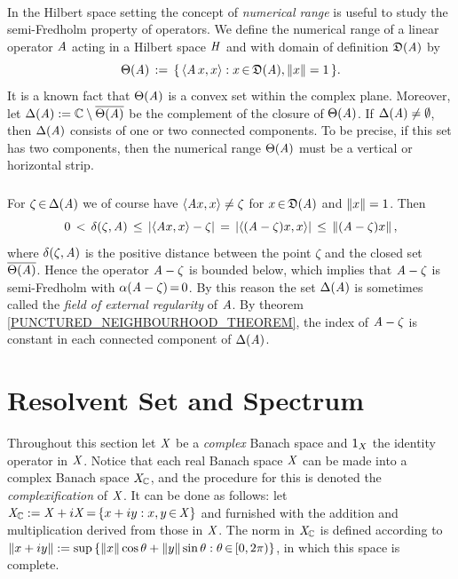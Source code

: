 \documentclass[11pt,twoside]{article}
\begin{document}
\paragraph*{} %
In the Hilbert space setting the concept of \textit{numerical range}
is useful to study the semi-Fredholm property of operators.
We define the {numerical range} of a linear operator $\mathit{A}$ acting
in a Hilbert space $\mathit{H}$ and with domain of definition $\mathfrak{D}(\mathit{A})$ by
\[
\Theta(\mathit{A}) \,:=\,
\{\,\langle \mathit{A} \,x,x \rangle: x {\,\in\,} \mathfrak{D}(\mathit{A}), \left\lVert x \right\rVert=1 \,\}.
\]
It is a known fact that
$\Theta(\mathit{A})$ is a convex set within the complex plane.
Moreover,
let $\Delta(\mathit{A}) := {\mathbb{C}} \setminus \overline{\Theta(\mathit{A})}$
be the complement of the closure of $\Theta(\mathit{A})$.
If $\Delta(\mathit{A}) \neq \emptyset$,
then $\Delta(\mathit{A})$ consists of one or two connected components.
To be precise,
if this set has two components,
then the numerical range $\Theta(\mathit{A})$ must be a vertical or horizontal strip.

\subparagraph*{}
For $\zeta {\,\in\,} \Delta(\mathit{A})$ we of course have $\langle \mathit{A} x,x \rangle \neq \zeta$
for $x {\,\in\,} \mathfrak{D}(\mathit{A})$ and $\left\lVert x \right\rVert=1$.
Then 
\[
0 \, < \, \delta(\zeta,\linA) \, \leq \,
\abs{\scalar{\linA x}{x} - \zeta} \=
\abs{\scalar{(\linA-\zeta)x}{x}} \, \leq \,
\norm{(\linA -\zeta) x},
\]
where $\delta(\zeta,\mathit{A})$ is the positive distance between the point $\zeta$
and the closed set $\overline{\Theta(\mathit{A})}$.
Hence the operator $\mathit{A} -\zeta$ is bounded below,
which implies that $\mathit{A}-\zeta$ is semi-Fredholm with $\alpha(\mathit{A}-\zeta) {\,=\,} 0$.
By this reason the set $\Delta(\mathit{A})$ is sometimes called
the \textit{field of external regularity} of $\mathit{A}$.
By theorem \ref{PUNCTURED_NEIGHBOURHOOD_THEOREM},
the index of $\mathit{A}-\zeta$ is constant
in each connected component of $\Delta(\mathit{A})$.

\section{Resolvent Set and Spectrum}
Throughout this section let $\mathit{X}$ be a \textit{complex} Banach space 
and ${\mathsf{1}}_X$ the identity operator in $\mathit{X}$.
Notice that each real Banach space $\mathit{X}$ can be made
into a complex Banach space $\mathit{X}_{{\mathbb{C}}}$,
and the procedure for this is denoted the \textit{complexification} of $\mathit{X}$.
It can be done as follows:
let $\mathit{X}_{{\mathbb{C}}} := \mathit{X} + i \mathit{X} {\,=\,} \{x+iy: x,y {\,\in\,} \mathit{X}\}$ and furnished
with the addition and multiplication derived from those in $\mathit{X}$.
The norm in $\mathit{X}_{{\mathbb{C}}}$ is defined according to
$\left\lVert x+iy \right\rVert :=
\sup\,\{\left\lVert x \right\rVert \cos \theta + \left\lVert y \right\rVert \sin \theta: \theta {\,\in\,} [0,2\pi)\}$,
in which this space is complete.
\end{document}
